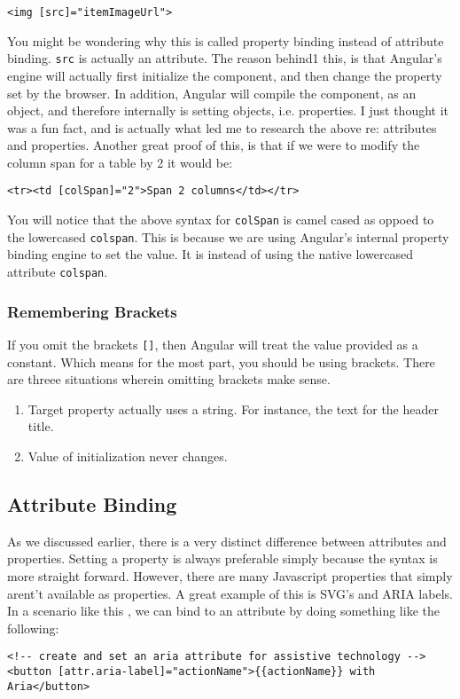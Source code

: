 \begin{lstlisting}
<img [src]="itemImageUrl">
\end{lstlisting}

You might be wondering why this is called property binding instead of 
attribute binding. \lstinline{src} is actually an attribute. The reason behind1
this, is that Angular's engine will actually first initialize the component, 
and then change the property set by the browser. In addition, Angular will 
compile the component, as an object, and therefore internally is setting 
objects, i.e. properties. I just thought it was a fun fact, and is actually 
what led me to research the above re: attributes and properties. Another great
proof of this, is that if we were to modify the column span for a table by 2
it would be: 
\begin{lstlisting}
<tr><td [colSpan]="2">Span 2 columns</td></tr>
\end{lstlisting}

You will notice that the above syntax for \lstinline{colSpan} is camel cased 
as oppoed to the lowercased \lstinline{colspan}. This is because we are using
Angular's internal property binding engine to set the value. It is instead of 
using the native lowercased attribute \lstinline{colspan}. 


\subsubsection{ Remembering Brackets }
If you omit the brackets \lstinline{[]}, then Angular will treat the value
provided as a constant. Which means for the most part, you should be using
brackets. There are threee situations wherein omitting brackets make sense. 
\begin{enumerate}
  \item Target property actually uses a string. For instance, the text for 
  the header title. 
  \item Value of initialization never changes.
\end{enumerate}

\subsection{ Attribute Binding }
As we discussed earlier, there is a very distinct difference between 
attributes and properties. Setting a property is always preferable 
simply because the syntax is more straight forward. However, there are many 
Javascript properties that simply arent't available as properties. A great
example of this is SVG's and ARIA labels. In a scenario like this , we can bind 
to an attribute by doing something like the following: 
\begin{lstlisting}
<!-- create and set an aria attribute for assistive technology -->
<button [attr.aria-label]="actionName">{{actionName}} with Aria</button>  
\end{lstlisting}

